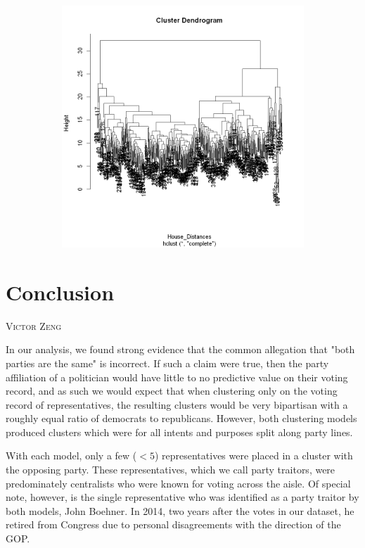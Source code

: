 \documentclass[12pt]{article}
\makeatletter
\newcommand{\chapterauthor}[1]{%
	{\parindent0pt\vspace*{-10pt}%
		\linespread{1.1}\large\scshape#1%
		\par\nobreak\vspace*{10pt}}
	\@afterheading%
}
\makeatother
\begin{document}
\begin{figure}[h]
\begin{subfigure}{.45\linewidth}
		\includegraphics[width=\textwidth]{Images/dendogram_complete}
	\end{subfigure}
\end{figure}  
\section{Conclusion}
\chapterauthor{Victor Zeng}
In our analysis, we found strong evidence that the common allegation that "both parties are the same" is incorrect. If such a claim were true, then the party affiliation of a politician would have little to no predictive value on their voting record, and as such we would expect that when clustering only on the voting record of representatives, the resulting clusters would be very bipartisan with a roughly equal ratio of democrats to republicans. However, both clustering models produced clusters which were for all intents and purposes split along party lines.  

With each model, only a few ($<5$) representatives were placed in a cluster with the opposing party. These representatives, which we call party traitors, were predominately centralists who were known for voting across the aisle. Of special note, however, is the single representative who was identified as a party traitor by both models, John Boehner. In 2014, two years after the votes in our dataset, he retired from Congress due to personal disagreements with the direction of the GOP.
\end{document}
